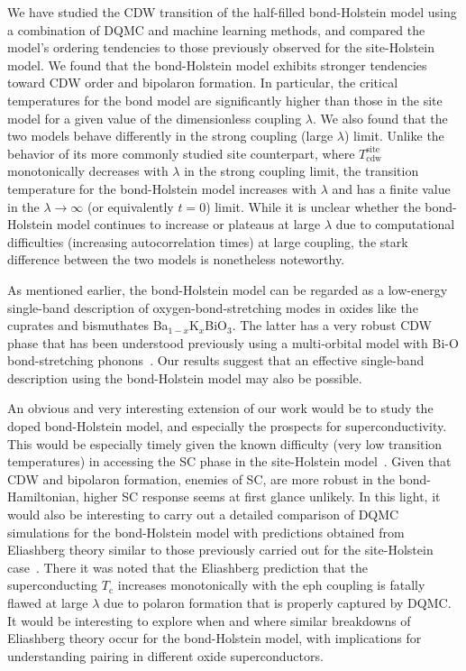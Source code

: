 \documentclass[%
reprint,
superscriptaddress,
nofootinbib,
twocolumn,
amsmath,amssymb,
aps,
prb,
]{revtex4-2}
\begin{document}
We have studied the \gls*{CDW} transition of the half-filled bond-Holstein model using a combination of \gls*{DQMC} and machine learning methods, and compared the model's ordering tendencies to those previously observed for the site-Holstein model. 
We found that the bond-Holstein model exhibits stronger tendencies toward \gls*{CDW} order and bipolaron formation. In particular, the critical temperatures for the bond model are significantly higher than those in the site model for a given value of the dimensionless coupling $\lambda$. We also found that the two models behave differently in the strong coupling (large $\lambda$) limit. Unlike the behavior of its more commonly studied site counterpart, where $T_\mathrm{cdw}^\mathrm{site}$ monotonically decreases with $\lambda$ in the strong coupling limit, the transition temperature for the bond-Holstein model increases with $\lambda$ and has a finite value in the $\lambda\rightarrow \infty$ (or equivalently $t = 0$) limit. 
While it is unclear whether the bond-Holstein model continues to increase or plateaus at large $\lambda$ due to computational difficulties (increasing autocorrelation times) at large coupling, the stark difference between the two models is nonetheless noteworthy.

As mentioned earlier, the bond-Holstein model can be regarded as a low-energy single-band description of oxygen-bond-stretching modes in oxides like the cuprates and bismuthates Ba$_{1-x}$K$_x$BiO$_3$. The latter has a very robust \gls*{CDW} phase that has been understood previously using a multi-orbital model with Bi-O bond-stretching phonons~\cite{CohenStead2023hybrid}. Our results suggest that an effective single-band description using the bond-Holstein model may also be possible.

An obvious and very interesting extension of our work would be to study the doped bond-Holstein model, and especially the prospects for superconductivity. This would be especially timely given the known difficulty (very low transition temperatures) in accessing the \gls*{SC} phase in the site-Holstein model~\cite{bradley21}. Given that \gls*{CDW} and bipolaron formation, enemies of \gls*{SC}, are more robust in the bond-Hamiltonian, higher \gls*{SC} response seems at first glance unlikely. In this light, it would also be interesting to carry out a detailed comparison of \gls*{DQMC} simulations for the bond-Holstein model with predictions obtained from Eliashberg theory similar to those previously carried out for the site-Holstein case~\cite{esterlis18}. There it was noted that the Eliashberg prediction that the superconducting $T_\mathrm{c}$ increases monotonically with the \gls*{eph} coupling is fatally flawed at large $\lambda$ due to polaron formation that is properly captured by \gls*{DQMC}. It would be interesting to explore when and where similar breakdowns of Eliashberg theory occur for the bond-Holstein model, with implications for understanding pairing in different oxide superconductors. 
\end{document}
